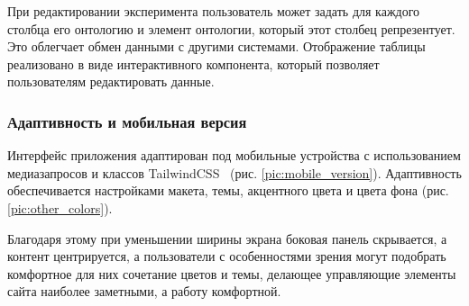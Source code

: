 При редактировании эксперимента пользователь может задать для каждого столбца его онтологию и элемент онтологии, который этот столбец репрезентует. Это облегчает обмен данными с другими системами. Отображение таблицы реализовано в виде интерактивного компонента, который позволяет пользователям редактировать данные.


\subsubsection{Адаптивность и мобильная версия}

Интерфейс приложения адаптирован под мобильные устройства с использованием медиазапросов и классов TailwindCSS~\cite{Library:TailwindCSS} (рис. \ref{pic:mobile_version}). Адаптивность обеспечивается настройками макета, темы, акцентного цвета и цвета фона (рис. \ref{pic:other_colors}).

Благодаря этому при уменьшении ширины экрана боковая панель скрывается, а контент центрируется, а пользователи с особенностями зрения могут подобрать комфортное для них сочетание цветов и темы, делающее управляющие элементы сайта наиболее заметными, а работу комфортной.

